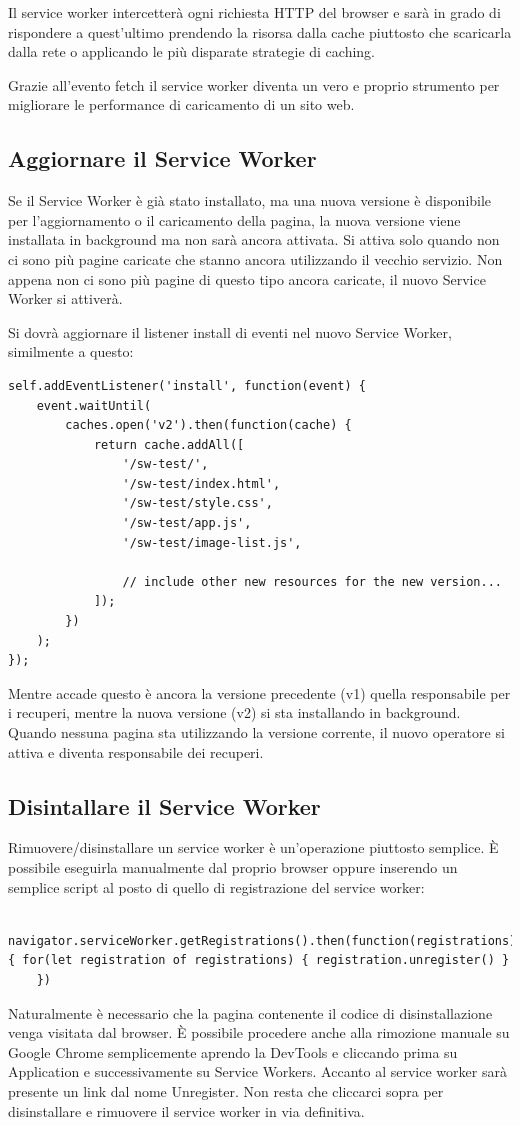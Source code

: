 \documentclass[italian]{article}
\begin{document}
Il service worker intercetterà ogni richiesta HTTP del browser e sarà in grado di rispondere a quest’ultimo prendendo la risorsa dalla cache piuttosto che scaricarla dalla rete o applicando le più disparate strategie di caching.

Grazie all’evento fetch il service worker diventa un vero e proprio strumento per migliorare le performance di caricamento di un sito web.


\subsection{Aggiornare il Service Worker}
Se il Service Worker è già stato installato, ma una nuova versione è disponibile per l'aggiornamento o il caricamento della pagina, la nuova versione viene installata in background ma non sarà ancora attivata. Si attiva solo quando non ci sono più pagine caricate che stanno ancora utilizzando il vecchio servizio. Non appena non ci sono più pagine di questo tipo ancora caricate, il nuovo Service Worker si attiverà.

Si dovrà aggiornare il listener install di eventi nel nuovo Service Worker, similmente a questo:
\begin{lstlisting}
self.addEventListener('install', function(event) {
	event.waitUntil(
		caches.open('v2').then(function(cache) {
			return cache.addAll([
				'/sw-test/',
				'/sw-test/index.html',
				'/sw-test/style.css',
				'/sw-test/app.js',
				'/sw-test/image-list.js',
								
				// include other new resources for the new version...
			]);
		})
	);
});
\end{lstlisting}
Mentre accade questo è ancora la versione precedente (v1) quella responsabile per i recuperi, mentre la nuova versione (v2) si sta installando in background.
Quando nessuna pagina sta utilizzando la versione corrente, il nuovo operatore si attiva e diventa responsabile dei recuperi.

\subsection{Disintallare il Service Worker}

Rimuovere/disinstallare un service worker è un’operazione piuttosto semplice. È possibile eseguirla manualmente dal proprio browser oppure inserendo un semplice script al posto di quello di registrazione del service worker:

\begin{lstlisting}
	navigator.serviceWorker.getRegistrations().then(function(registrations) { for(let registration of registrations) { registration.unregister() }
	})
\end{lstlisting}
Naturalmente è necessario che la pagina contenente il codice di disinstallazione venga visitata dal browser. È possibile procedere anche alla rimozione manuale su Google Chrome semplicemente aprendo la DevTools e cliccando prima su Application e successivamente su Service Workers. Accanto al service worker sarà presente un link dal nome Unregister. Non resta che cliccarci sopra per disinstallare e rimuovere il service worker in via definitiva.
\end{document}
